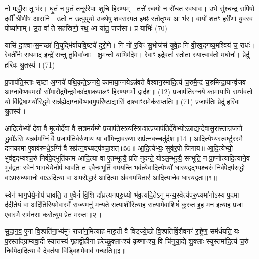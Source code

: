 नो॒ म॒र्द्धी॒रा तू भ॑र। घृ॒तं न पू॒तं त॒नूर॑रे॒पाः शुचि॒ हिर॑ण्यम्। तत्ते॑ रु॒क्मो न रो॑चत स्वधावः। उ॒भे सु॑श्चन्द्र स॒र्पिषो॒ दर्वी᳚ श्रीणीष आ॒सनि॑। उ॒तो न॒ उत्पु॑पूर्या उ॒क्थेषु॑ शवसस्पत॒ इषꣴ॑ स्तो॒तृभ्य॒ आ भ॑र। वायो॑ श॒तꣳ हरी॑णां यु॒वस्व॒ पोष्या॑णाम्। उ॒त वा॑ ते सह॒स्रिणो॒ रथ॒ आ या॑तु॒ पाज॑सा। प्र याभिः॑ (70)

यासि॑ दा॒श्वाꣳस॒मच्छा॑ नि॒युद्भि॑र्वायवि॒ष्टये॑ दुरो॒णे। नि नो॑ र॒यिꣳ सु॒भोज॑सं युवे॒ह नि वी॒रव॒द्गव्य॒मश्वि॑यं च॒ राधः॑। रे॒वती᳚र्नः सध॒माद॒ इन्द्रे॑ सन्तु तु॒विवा॑जाः। क्षु॒मन्तो॒ याभि॒र्मदे॑म। रे॒वाꣳ इद्रे॒वतः॑ स्तो॒ता स्यात्त्वाव॑तो म॒घोनः॑। प्रेदु॑ हरिवः श्रु॒तस्य॑॥ (71)

{\anuvakamend[जि॒नोषि॑ देभुः॒ प्र ह॒व्यं ब॒भूथ॒ मा याभि॑श्चत्वारि॒ꣳ॒शच्च॑॥ (12)]}

{\scriptsize प्र॒जाप॑ति॒स्ताः सृ॒ष्टा अ॒ग्नये॑ पथि॒कृते॒\-ऽग्नये॒ कामा॑या॒ग्नये\-ऽन्न॑वते वैश्वान॒रमा॑दि॒त्यं च॒रुमै॒न्द्रं च॒रुमिन्द्रा॒यान्वृ॑जव आग्नावैष्ण॒वम॒सौ सो॑मारौ॒द्रमै॒न्द्रमेका॑दशकपालꣳ हिरण्यग॒र्भो द्वाद॑श॥ (12) प्र॒जाप॑तिर॒ग्नये॒ कामा॑या॒भि सम्भ॑वतो॒ यो वि॑द्विषा॒णयो॑रि॒द्ध्मे सन्न॑ह्येदाग्नावैष्ण॒वमु॒परि॑ष्टा॒द्यासि॑ दा॒श्वाꣳस॒मेक॑सप्ततिः॥ (71) प्र॒जाप॑तिः॒ प्रेदु॑ हरिवः श्रु॒तस्य॑॥}


{\scriptsize {आ॒दि॒त्येभ्यो॑ दे॒वा वै मृ॒त्योर्दे॒वा वै स॒त्रम॑र्य॒म्णे प्र॒जाप॑ते॒स्त्रय॑स्त्रिꣳशत्प्र॒जाप॑तिर्दे॒वेभ्यो॒\-ऽन्नाद्य॑न्देवासु॒रास्तान्रज॑नो द्ध्रु॒वो॑\-ऽसि॒ यन्नव॑म॒ग्निं वै प्र॒जाप॑ति॒र्वरु॑णाय॒ या वा॑मिन्द्रावरुणा॒ सप्र॑त्न॒वच्चतु॑र्दश॥14॥ आ॒दि॒त्येभ्य॒स्त्वष्टु॑रस्मै॒ दान॑कामा ए॒वाव॑रुन्धे॒\-ऽग्निं वै सप्र॑त्न॒वथ्षट्प॑ञ्चा॒शत्॥56॥ आ॒दि॒त्येभ्यः॒ सुव॑र॒पो जि॑गाय॥}}
\setcounter{anuvakam}{0}
आ॒दि॒त्येभ्यो॒ भुव॑द्वद्भ्यश्च॒रुं निर्व॑पे॒द्भूति॑काम आदि॒त्या वा ए॒तम्भूत्यै॒ प्रति॑ नुदन्ते॒ यो\-ऽल॒म्भूत्यै॒ सन्भूतिं॒ न प्रा॒प्नोत्या॑दि॒त्याने॒व भुव॑द्वतः॒ स्वेन॑ भाग॒धेये॒नोप॑ धावति॒ त ए॒वैन॒म्भूतिं॑ गमयन्ति॒ भव॑त्ये॒वादि॒त्येभ्यो॑ धा॒रय॑द्वद्भ्यश्च॒रुं निर्व॑पे॒दप॑रुद्धो वा\-ऽपरु॒ध्यमा॑नो वा\-ऽ\-ऽदि॒त्या वा अ॑परो॒द्धार॑ आदि॒त्या अ॑वगमयि॒तार॑ आदि॒त्याने॒व धा॒रय॑द्वतः॥१॥

स्वेन॑ भाग॒धेये॒नोप॑ धावति॒ त ए॒वैनं॑ वि॒शि दा᳚ध्रत्यनपरु॒ध्यो भ॑व॒त्यदि॒ते\-ऽनु॑ मन्य॒स्वेत्य॑परु॒ध्यमा॑नो\-ऽस्य प॒दमा द॑दीते॒यं वा अदि॑तिरि॒यमे॒वास्मै॑ रा॒ज्यमनु॑ मन्यते स॒त्याशीरित्या॑ह स॒त्यामे॒वाशिषं॑ कुरुत इ॒ह मन॒ इत्या॑ह प्र॒जा ए॒वास्मै॒ सम॑नसः करो॒त्युप॒ प्रेत॑ मरुतः॥२॥

सु॒दा॒न॒व॒ ए॒ना वि॒श्पति॑ना॒भ्य॑मुꣳ राजा॑न॒मित्या॑ह मारु॒ती वै विड्ज्ये॒ष्ठो वि॒श्पति॑र्वि॒शैवनꣳ॑ रा॒ष्ट्रेण॒ सम॑र्धयति॒ यः प॒रस्ता᳚द्ग्राम्यवा॒दी स्यात्तस्य॑ गृ॒हाद्व्री॒हीना ह॑रेच्छु॒क्लाꣳश्च॑ कृ॒ष्णाꣳश्च॒ वि चि॑नुया॒द्ये शु॒क्लाः स्युस्तमा॑दि॒त्यं च॒रुं निर्व॑पेदादि॒त्या वै दे॒वत॑या॒ विड्विश॑मे॒वाव॑ गच्छति॥३॥

